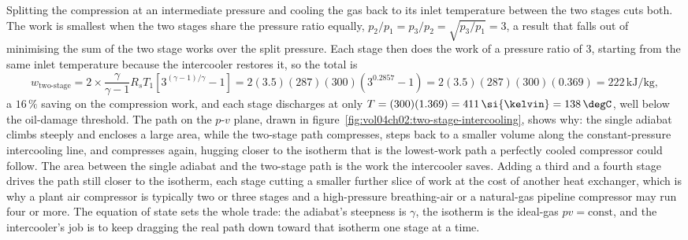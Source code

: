 Splitting the compression at an intermediate pressure and cooling the gas back
to its inlet temperature between the two stages cuts both. The work is smallest
when the two stages share the pressure ratio equally, $p_2/p_1 = p_3/p_2 =
\sqrt{p_3/p_1} = 3$, a result that falls out of minimising the sum of the two
stage works over the split pressure. Each stage then does the work of a
pressure ratio of $3$, starting from the same inlet temperature because the
intercooler restores it, so the total is
\[
w_{\text{two-stage}} = 2\times\frac{\gamma}{\gamma - 1} R_s T_1\left[3^{(\gamma
- 1)/\gamma} - 1\right] = 2(3.5)(287)(300)(3^{0.2857} - 1) =
2(3.5)(287)(300)(0.369) = 222\,\text{kJ}/\text{kg},
\]
a $16\,\%$ saving on the compression work, and each stage discharges at only
$T = (300)(1.369) = 411\,\si{\kelvin} = 138\,\degC$, well below the oil-damage
threshold. The path on the $p$-$v$ plane, drawn in
figure~\ref{fig:vol04ch02:two-stage-intercooling}, shows why: the single
adiabat climbs steeply and encloses a large area, while the two-stage path
compresses, steps back to a smaller volume along the constant-pressure
intercooling line, and compresses again, hugging closer to the isotherm that is
the lowest-work path a perfectly cooled compressor could follow. The area
between the single adiabat and the two-stage path is the work the intercooler
saves. Adding a third and a fourth stage drives the path still closer to the
isotherm, each stage cutting a smaller further slice of work at the cost of
another heat exchanger, which is why a plant air compressor is typically two or
three stages and a high-pressure breathing-air or a natural-gas pipeline
compressor may run four or more. The equation of state sets the whole trade: the
adiabat's steepness is $\gamma$, the isotherm is the ideal-gas $pv =
\text{const}$, and the intercooler's job is to keep dragging the real path down
toward that isotherm one stage at a time.




